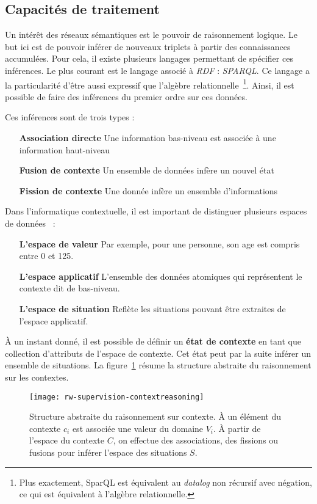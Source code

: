 \subsection{Capacités de traitement}
Un intérêt des réseaux sémantiques est le pouvoir de raisonnement logique. Le but ici est de pouvoir inférer de nouveaux triplets à partir des connaissances accumulées. Pour cela, il existe plusieurs langages permettant de spécifier ces inférences. Le plus courant est le langage associé à \textit{RDF} : \textit{SPARQL}. Ce langage a la particularité d'être aussi expressif que l'algèbre relationnelle~\cite{Angles:sparql}\footnote{Plus exactement, SparQL est équivalent au \textit{datalog} non récursif avec négation, ce qui est équivalent à l'algèbre relationnelle.}. Ainsi, il est possible de faire des inférences du premier ordre sur ces données.

Ces inférences sont de trois types :
\begin{itemize}
 \item[\textbf{Association directe}] Une information bas-niveau est associée à une information haut-niveau 
 \item[\textbf{Fusion de contexte}] Un ensemble de données infère un nouvel état 
 \item[\textbf{Fission de contexte}] Une donnée infère un ensemble d'informations
\end{itemize}

Dans l'informatique contextuelle, il est important de distinguer plusieurs espaces de données~\cite{Padovitz:agent} :
\begin{itemize}
 \item[\textbf{L'espace de valeur}] Par exemple, pour une personne, son age est compris entre 0 et 125.
 \item[\textbf{L'espace applicatif}] L'ensemble des données atomiques qui représentent le contexte dit de bas-niveau.
 \item[\textbf{L'espace de situation}] Reflète les situations pouvant être extraites de l'espace applicatif.
\end{itemize}

À un instant donné, il est possible de définir un \textbf{état de contexte} en tant que collection d'attributs de l'espace de contexte. Cet état peut par la suite inférer un ensemble de situations. La figure~\ref{rw-supervision-contextreasoning} résume la structure abstraite du raisonnement sur les contextes.

\begin{figure}[ht]
    \centering
    \texttt{[image: rw-supervision-contextreasoning]}
    \caption{Structure abstraite du raisonnement sur contexte. À un élément du contexte $c_i$ est associée une valeur du domaine $V_i$. À partir de l'espace du contexte $C$, on effectue des associations, des fissions ou fusions pour inférer l'espace des situations $S$.}\label{rw-supervision-contextreasoning}
\end{figure}

